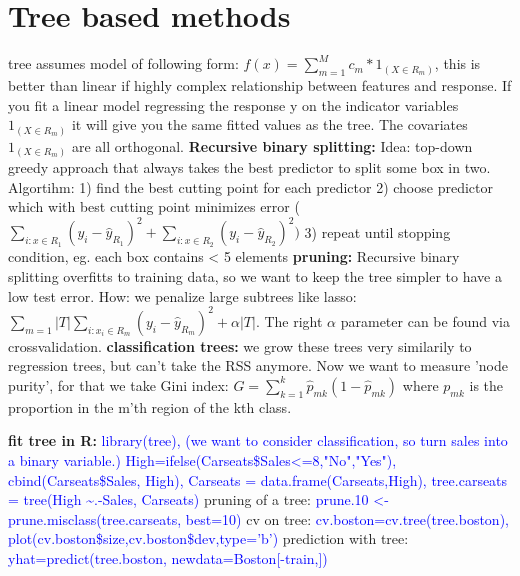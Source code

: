 \section{Tree based methods}
tree assumes model of following form: 
$f(x) = \sum_{m=1}^M c_m*1_{(X \in R_m)}$, this is better than linear if highly complex relationship between features and response. If you fit a linear model regressing the response y on the indicator variables $1_{(X \in R_m)}$ it will give you the same fitted values as the tree. The covariates $1_{(X \in R_m)}$ are all orthogonal.
\textbf{Recursive binary splitting: }
Idea: top-down greedy approach that always takes the best predictor to split some box in two. Algortihm:
1) find the best cutting point for each predictor
2) choose predictor which with best cutting point minimizes error ($\sum_{i:x \in R_1}(y_i-\hat y_{R_1})^2+\sum_{i:x \in R_2}(y_i-\hat y_{R_2})^2)$
3) repeat until stopping condition, eg. each box contains < 5 elements
\textbf{pruning: } Recursive binary splitting overfitts to training data, so we want to keep the tree simpler to have a low test error. How: we penalize large subtrees like lasso: $\sum_{m=1}{|T|}\sum_{i: x_i \in R_m}(y_i - \hat y_{R_m})^2 + \alpha|T|$. The right $\alpha$ parameter can be found via crossvalidation. 
\textbf{classification trees: } we grow these trees very similarily to regression trees, but can't take the RSS anymore. Now we want to measure 'node purity', for that we take Gini index: $G = \sum_{k=1}^k \hat p_{mk}(1-\hat p_{mk})$ where $p_{mk}$ is the proportion in the m'th region of the kth class.

\textbf{fit tree in R:} \textcolor{blue}{library(tree), (we want to consider classification, so turn sales into a binary variable.)
High=ifelse(Carseats\$Sales<=8,"No","Yes"), cbind(Carseats\$Sales, High), Carseats = data.frame(Carseats,High), tree.carseats = tree(High \textasciitilde .-Sales, Carseats)} pruning of a tree: \textcolor{blue}{prune.10 <- prune.misclass(tree.carseats, best=10)} cv on tree: \textcolor{blue}{cv.boston=cv.tree(tree.boston), plot(cv.boston\$size,cv.boston\$dev,type='b')} prediction with tree: \textcolor{blue}{yhat=predict(tree.boston, newdata=Boston[-train,])}